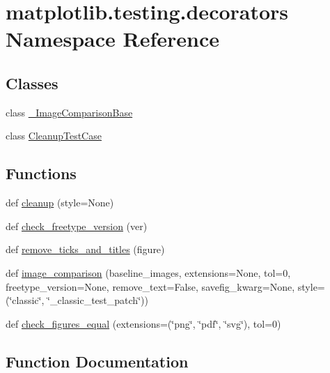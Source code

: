\hypertarget{namespacematplotlib_1_1testing_1_1decorators}{}\section{matplotlib.\+testing.\+decorators Namespace Reference}
\label{namespacematplotlib_1_1testing_1_1decorators}
\subsection*{Classes}
\begin{DoxyCompactItemize}
\item 
class \hyperlink{classmatplotlib_1_1testing_1_1decorators_1_1__ImageComparisonBase}{\+\_\+\+Image\+Comparison\+Base}
\item 
class \hyperlink{classmatplotlib_1_1testing_1_1decorators_1_1CleanupTestCase}{Cleanup\+Test\+Case}
\end{DoxyCompactItemize}
\subsection*{Functions}
\begin{DoxyCompactItemize}
\item 
def \hyperlink{namespacematplotlib_1_1testing_1_1decorators_aca4dda0538e182fbc9232ef377fba97d}{cleanup} (style=None)
\item 
def \hyperlink{namespacematplotlib_1_1testing_1_1decorators_ae29d25a87e06d278ca1ec28163c6d526}{check\+\_\+freetype\+\_\+version} (ver)
\item 
def \hyperlink{namespacematplotlib_1_1testing_1_1decorators_afcf7b690a5627c0a0a23b0b5733fb496}{remove\+\_\+ticks\+\_\+and\+\_\+titles} (figure)
\item 
def \hyperlink{namespacematplotlib_1_1testing_1_1decorators_ac21f58ae7b14bdc094ee33a58d743bfc}{image\+\_\+comparison} (baseline\+\_\+images, extensions=None, tol=0, freetype\+\_\+version=None, remove\+\_\+text=False, savefig\+\_\+kwarg=None, style=(\char`\"{}classic\char`\"{}, \char`\"{}\+\_\+classic\+\_\+test\+\_\+patch\char`\"{}))
\item 
def \hyperlink{namespacematplotlib_1_1testing_1_1decorators_add8fbd22aa6392d12bf4d104e52651b8}{check\+\_\+figures\+\_\+equal} (extensions=(\char`\"{}png\char`\"{}, \char`\"{}pdf\char`\"{}, \char`\"{}svg\char`\"{}), tol=0)
\end{DoxyCompactItemize}


\subsection{Function Documentation}
\mbox{\label{namespacematplotlib_1_1testing_1_1decorators_add8fbd22aa6392d12bf4d104e52651b8}} 
